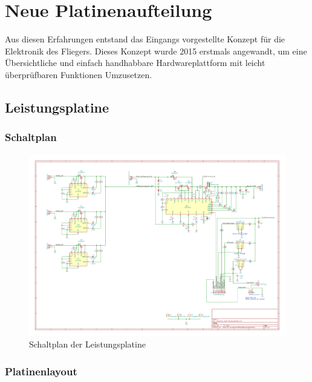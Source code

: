 \section{Neue Platinenaufteilung}

Aus diesen Erfahrungen entstand das Eingangs vorgestellte Konzept für die Elektronik des Fliegers.
Dieses Konzept wurde 2015 erstmals angewandt, um eine Übersichtliche und einfach handhabbare Hardwareplattform mit leicht überprüfbaren Funktionen Umzusetzen.

\subsection{Leistungsplatine}

\subsubsection{Schaltplan}

\newpage

\begin{figure}[H]
\centering
\includegraphics[width=1.4\textwidth,angle =90]{bilder/Centerbox/Centerbox-Front-Power_AUVSI16.pdf} 
\caption{Schaltplan der Leistungsplatine} 
\label{fig:Schaltplan der Leistungsplatine}
\end{figure}

\subsubsection{Platinenlayout}

